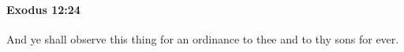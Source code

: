 
		\paragraph{Exodus 12:24} %
			\label{EXODUS-12-24}

			And ye shall observe this thing for an ordinance to thee and to thy sons for ever.


